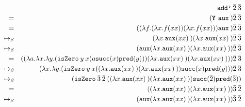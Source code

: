 \documentclass[11pt]{article}
\begin{document}
\begin{enumerate}
	      \begin{align*}
		                    &  & \texttt{add'} \: \bar{2} \: \bar{3}                                                                                                                                                                & \\
		      =             &  & (\textbf{\texttt{Y} } \texttt{aux} \: ) \bar{2} \: \bar{3}                                                                                                                                         & \\
		      =             &  & (( \lambda f. ( \lambda x. f(xx))( \lambda x. f(xx))) \texttt{aux} \: ) \bar{2} \: \bar{3}                                                                                                         & \\
		      \mapsto_\beta &  & ( \lambda x. \texttt{aux}(x x) \:)( \lambda x. \texttt{aux}(x x) \:) \bar{2} \: \bar{3}                                                                                                            & \\
		      \mapsto_\beta &  & (\texttt{aux}( \lambda x. \texttt{aux}(x x) \:)( \lambda x. \texttt{aux}(x x) \:)) \bar{2} \: \bar{3}                                                                                              & \\
		      =             &  & (( \lambda a. \lambda x. \lambda y. ( \texttt{isZero} \: y \: x ( a \texttt{succ}(x) \texttt{pred}(y)))( \lambda x. \texttt{aux}(x x) \:)( \lambda x. \texttt{aux}(x x) \:))) \bar{2} \: \bar{3}   & \\
		      \mapsto_\beta &  & ( \lambda x. \lambda y. ( \texttt{isZero} \: y \: x (( \lambda x. \texttt{aux}(x x) \:)( \lambda x. \texttt{aux}(x x) \:)) \texttt{succ}(x) \texttt{pred}(y))) \bar{2} \: \bar{3}                  & \\
		      \mapsto_\beta &  & ( \texttt{isZero} \: \bar{3} \: \bar{2} \: (( \lambda x. \texttt{aux}(x x) \:)( \lambda x. \texttt{aux}(x x) \:)) \texttt{succ}( \bar{2} ) \texttt{pred}( \bar{3} ))                               & \\
		      =             &  & (( \lambda x. \texttt{aux}(x x) \:)( \lambda x. \texttt{aux}(x x) \:)) \bar{3} \: \bar{2}                                                                                                          & \\
		      \mapsto_\beta &  & ( \texttt{aux}( \lambda x. \texttt{aux}(x x) \:)( \lambda x. \texttt{aux}(x x) \:)) \bar{3} \: \bar{2}                                                                                             & \\

\end{align*}
\end{enumerate}
\end{document}
